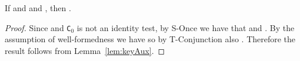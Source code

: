 \begin{Lemma}
\label{lem:key}
 If \emph{}
and \emph{} and
\emph{}, then
  \emph{}. 
\end{Lemma}
\begin{proof}
Since  and  {\tt C$_0$} is not an
 identity test, by {\sc S-Once} we have that 
 and
    .
By the assumption of well-formedness we have  so
by {\sc T-Conjunction} also . 
Therefore the result follows from Lemma~\ref{lem:keyAux}.
\end{proof}

